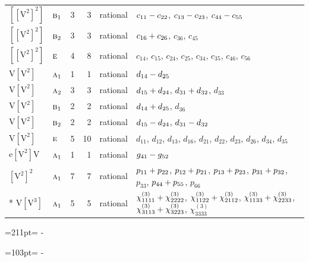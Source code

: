 \documentclass[10pt,a4paper]{article}
\newcommand{\needspace}[1]{\par\penalty-100\begingroup\dimen0=#1\relax\dimen2=\pagegoal
  \advance\dimen2-\pagetotal\ifdim\dimen0>\dimen2\relax\ifdim\dimen2>0pt\vfil\break\fi\fi
  \endgroup}
\numberwithin{equation}{section}
\newcommand{\irr}[1]{\text{\normalfont\scshape #1}}
\newcommand{\jahn}[1]{\mathrm{#1}}
\newlength{\fillwidth}\newlength{\cellwidth}\newlength{\colwidth}
\newcommand{\signbreak}{\penalty100\relax}
\begin{document}
{\begin{longtable}{@{}llrrl>{\RaggedRight\arraybackslash}p{\fillwidth}@{}}
$\jahn{[[V^{2}]^{2}]}$ & $\irr{b}_{1}$ & 3 & 3 & rational & $c_{11} -\signbreak c_{22}$, $c_{13} -\signbreak c_{23}$, $c_{44} -\signbreak c_{55}$\\
$\jahn{[[V^{2}]^{2}]}$ & $\irr{b}_{2}$ & 3 & 3 & rational & $c_{16} +\signbreak c_{26}$, $c_{36}$, $c_{45}$\\
$\jahn{[[V^{2}]^{2}]}$ & $\irr{e}$ & 4 & 8 & rational & $c_{14}$, $c_{15}$, $c_{24}$, $c_{25}$, $c_{34}$, $c_{35}$, $c_{46}$, $c_{56}$\\
$\jahn{V[V^{2}]}$ & $\irr{a}_{1}$ & 1 & 1 & rational & $d_{14} -\signbreak d_{25}$\\
$\jahn{V[V^{2}]}$ & $\irr{a}_{2}$ & 3 & 3 & rational & $d_{15} +\signbreak d_{24}$, $d_{31} +\signbreak d_{32}$, $d_{33}$\\
$\jahn{V[V^{2}]}$ & $\irr{b}_{1}$ & 2 & 2 & rational & $d_{14} +\signbreak d_{25}$, $d_{36}$\\
$\jahn{V[V^{2}]}$ & $\irr{b}_{2}$ & 2 & 2 & rational & $d_{15} -\signbreak d_{24}$, $d_{31} -\signbreak d_{32}$\\
$\jahn{V[V^{2}]}$ & $\irr{e}$ & 5 & 10 & rational & $d_{11}$, $d_{12}$, $d_{13}$, $d_{16}$, $d_{21}$, $d_{22}$, $d_{23}$, $d_{26}$, $d_{34}$, $d_{35}$\\
$\jahn{e[V^{2}]V}$ & $\irr{a}_{1}$ & 1 & 1 & rational & $\mathnormal{g}_{41} -\signbreak \mathnormal{g}_{52}$\\
$\jahn{[V^{2}]^{2}}$ & $\irr{a}_{1}$ & 7 & 7 & rational & $p_{11} +\signbreak p_{22}$, $p_{12} +\signbreak p_{21}$, $p_{13} +\signbreak p_{23}$, $p_{31} +\signbreak p_{32}$, $p_{33}$, $p_{44} +\signbreak p_{55}$, $p_{66}$\\*
$\jahn{V[V^{3}]}$ & $\irr{a}_{1}$ & 5 & 5 & rational & $\chi^{(3)}_{1111} +\signbreak \chi^{(3)}_{2222}$, $\chi^{(3)}_{1122} +\signbreak \chi^{(3)}_{2112}$, $\chi^{(3)}_{1133} +\signbreak \chi^{(3)}_{2233}$, $\chi^{(3)}_{3113} +\signbreak \chi^{(3)}_{3223}$, $\chi^{(3)}_{3333}$\\
\bottomrule\end{longtable}}
\needspace{211pt}
\needspace{103pt}
\end{document}
